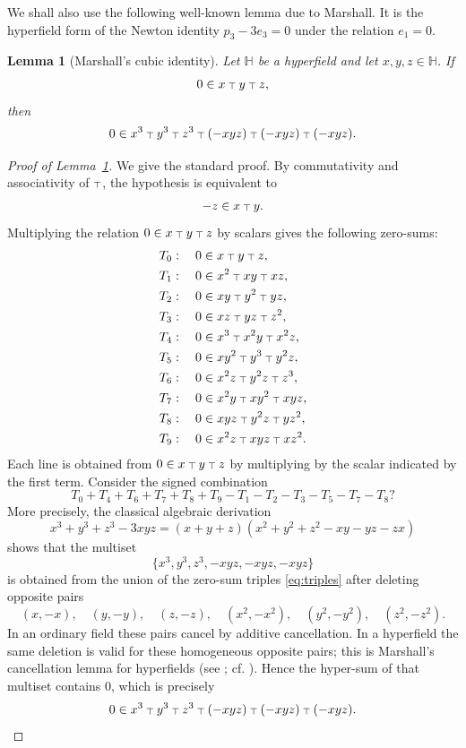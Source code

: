 \documentclass[11pt]{article}
\newtheorem{lemma}[theorem]{Lemma}
\newcommand{\boxplus}{\mathbin{\lower 0.86108pt\hbox{$\scriptstyle\top$}}}
\newcommand{\hypfield}{\mathbb{H}}
\begin{document}
We shall also use the following well-known lemma due to Marshall.
It is the hyperfield form of the Newton identity
\(p_3-3e_3=0\) under the relation \(e_1=0\).

\begin{lemma}[Marshall's cubic identity]\label{lem:marshall}
Let \(\hypfield\) be a hyperfield and let \(x,y,z\in\hypfield\).  If
\[
0\in x\boxplus y\boxplus z,
\]
then
\[
0\in x^3\boxplus y^3\boxplus z^3
\boxplus (-xyz)\boxplus (-xyz)\boxplus (-xyz).
\]
\end{lemma}

\begin{proof}[Proof of Lemma~\ref{lem:marshall}]
We give the standard proof.  By commutativity and associativity of
\(\boxplus\), the hypothesis is equivalent to
\[
-z\in x\boxplus y.
\]
Multiplying the relation \(0\in x\boxplus y\boxplus z\) by scalars gives
the following zero-sums:
\begin{equation}\label{eq:triples}
\begin{aligned}
T_0&:\quad 0\in x\boxplus y\boxplus z,\\
T_1&:\quad 0\in x^2\boxplus xy\boxplus xz,\\
T_2&:\quad 0\in xy\boxplus y^2\boxplus yz,\\
T_3&:\quad 0\in xz\boxplus yz\boxplus z^2,\\
T_4&:\quad 0\in x^3\boxplus x^2y\boxplus x^2z,\\
T_5&:\quad 0\in xy^2\boxplus y^3\boxplus y^2z,\\
T_6&:\quad 0\in x^2z\boxplus y^2z\boxplus z^3,\\
T_7&:\quad 0\in x^2y\boxplus xy^2\boxplus xyz,\\
T_8&:\quad 0\in xyz\boxplus y^2z\boxplus yz^2,\\
T_9&:\quad 0\in x^2z\boxplus xyz\boxplus xz^2.
\end{aligned}
\end{equation}
Each line is obtained from \(0\in x\boxplus y\boxplus z\) by multiplying by
the scalar indicated by the first term.  Consider the signed combination
\[
T_0+T_4+T_6+T_7+T_8+T_9
-T_1-T_2-T_3-T_5-T_7-T_8?
\]
More precisely, the classical algebraic derivation
\[
x^3+y^3+z^3-3xyz
=
(x+y+z)(x^2+y^2+z^2-xy-yz-zx)
\]
shows that the multiset
\[
\{x^3,y^3,z^3,-xyz,-xyz,-xyz\}
\]
is obtained from the union of the zero-sum triples \eqref{eq:triples} after
deleting opposite pairs
\[
(x,-x),\quad (y,-y),\quad (z,-z),\quad
(x^2,-x^2),\quad (y^2,-y^2),\quad (z^2,-z^2).
\]
In an ordinary field these pairs cancel by additive cancellation.  In a
hyperfield the same deletion is valid for these homogeneous opposite pairs;
this is Marshall's cancellation lemma for hyperfields (see \cite{marshall};
cf. \cite[Theorem 3.A and the proof of Theorem 4.A]{viro}).  Hence the
hyper-sum of that multiset contains \(0\), which is precisely
\[
0\in x^3\boxplus y^3\boxplus z^3
\boxplus (-xyz)\boxplus (-xyz)\boxplus (-xyz).
\]
\end{proof}
\end{document}
